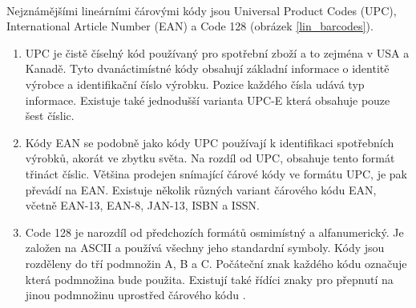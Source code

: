 \paragraph{} Nejznámějšími lineárními čárovými kódy jsou Universal Product Codes (UPC), International Article Number (EAN) a Code 128 (obrázek \ref{lin_barcodes}).
\begin{enumerate}
    \item UPC je čistě číselný kód používaný pro spotřební zboží a to zejména v USA a Kanadě. Tyto dvanáctimístné kódy obsahují základní informace o identitě výrobce a identifikační číslo výrobku. Pozice každého čísla udává typ informace. Existuje také jednodušší varianta UPC-E která obsahuje pouze šest číslic.
    \item  Kódy EAN se podobně jako kódy UPC používají k identifikaci spotřebních výrobků, akorát ve zbytku světa. Na rozdíl od UPC, obsahuje tento formát třináct číslic. Většina prodejen snímající čárové kódy ve formátu UPC, je pak převádí na EAN. Existuje několik různých variant čárového kódu EAN, včetně EAN-13, EAN-8, JAN-13, ISBN a ISSN.
    \item  Code 128 je narozdíl od předchozích formátů osmimístný a alfanumerický. Je založen na ASCII a používá všechny jeho standardní symboly. Kódy jsou rozděleny do tří podmnožin A, B a C. Počáteční znak každého kódu označuje která podmnožina bude použita. Existují také řídíci znaky pro přepnutí na jinou podmnožinu uprostřed čárového kódu \cite{barcode_types}.
\end{enumerate}


